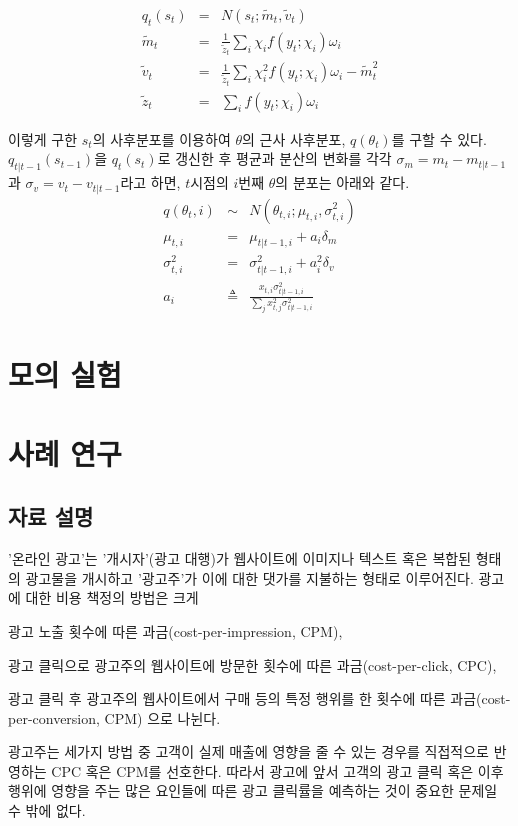 \documentclass[oneside,b5paper,11pt]{book} %
\begin{document}
\begin{eqnarray}
q_t(s_t) &=& N(s_t; \tilde{m}_t, \tilde{v}_t)
\\ \tilde{m}_t &=& \frac{1}{\tilde{z}_t} \sum_i \chi_i f(y_t; \chi_i ) \omega_i
\\ \tilde{v}_t &=& \frac{1}{\tilde{z}_t} \sum_i \chi^2_i f(y_t; \chi_i ) \omega_i - \tilde{m}^2_t
\\ \tilde{z}_t &=& \sum_i f(y_t; \chi_i ) \omega_i
\end{eqnarray}

이렇게 구한 $s_t$의 사후분포를 이용하여 $\theta$의 근사 사후분포,  $q(\theta_t)$를 구할 수 있다. $q_{t|t-1}(s_{t-1})$을 $q_{t}(s_t)$로 갱신한 후 평균과 분산의 변화를 각각 $\sigma_m = m_t - m_{t|t-1}$과 $\sigma_v = v_t - v_{t|t-1}$라고 하면, $t$시점의 $i$번째 $\theta$의 분포는 아래와 같다.\citep{Murphy2012}
\begin{eqnarray}
   q(\theta_t,i) &\sim& N(\theta_{t,i};\mu_{t,i}, \sigma^2_{t,i})
\\ \mu_{t,i} &=& \mu_{t|t-1,i} + a_i \delta_m
\\ \sigma^2_{t,i} &=& \sigma^2_{t|t-1,i} + a^2_i \delta_v
\\ a_i &\triangleq& \frac{x_{t,i}\sigma^2_{t|t-1,i}}{\sum_j x^2_{t,j}\sigma^2_{t|t-1,i}}
\end{eqnarray}



%
%
\chapter{모의 실험}


%
%
\chapter{사례 연구}

\section{자료 설명}
 '온라인 광고'는 '개시자'(광고 대행)가 웹사이트에 이미지나 텍스트 혹은 복합된 형태의 광고물을 개시하고 '광고주'가 이에 대한 댓가를 지불하는 형태로 이루어진다. 광고에 대한 비용 책정의 방법은 크게
 \begin{inparaenum}[i)]
 \item 광고 노출 횟수에 따른 과금(cost-per-impression, CPM),
 \item 광고 클릭으로 광고주의 웹사이트에 방문한 횟수에 따른 과금(cost-per-click, CPC),
 \item 광고 클릭 후 광고주의 웹사이트에서 구매 등의 특정 행위를 한 횟수에 따른 과금(cost-per-conversion, CPM) 으로 나뉜다.
 \end{inparaenum}
 광고주는 세가지 방법 중 고객이 실제 매출에 영향을 줄 수 있는 경우를 직접적으로 반영하는 CPC 혹은 CPM를 선호한다. 따라서 광고에 앞서 고객의 광고 클릭 혹은 이후 행위에 영향을 주는 많은 요인들에 따른 광고 클릭률을 예측하는 것이 중요한 문제일 수 밖에 없다.\citep{Chapelle2013}
 
\end{document}
